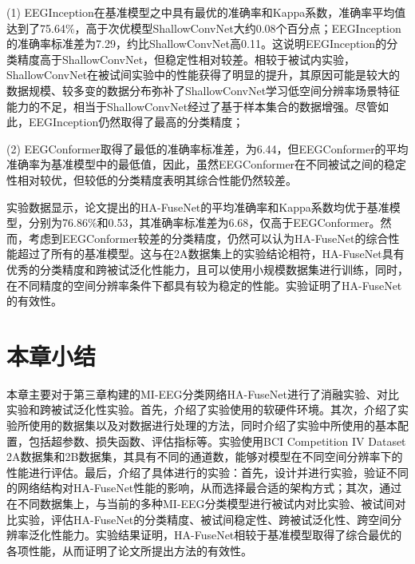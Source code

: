 (1) EEGInception在基准模型之中具有最优的准确率和Kappa系数，准确率平均值达到了75.64\%，高于次优模型ShallowConvNet大约0.08个百分点；EEGInception的准确率标准差为7.29，约比ShallowConvNet高0.11。这说明EEGInception的分类精度高于ShallowConvNet，但稳定性相对较差。相较于被试内实验，ShallowConvNet在被试间实验中的性能获得了明显的提升，其原因可能是较大的数据规模、较多变的数据分布弥补了ShallowConvNet学习低空间分辨率场景特征能力的不足，相当于ShallowConvNet经过了基于样本集合的数据增强。尽管如此，EEGInception仍然取得了最高的分类精度；

(2) EEGConformer取得了最低的准确率标准差，为6.44，但EEGConformer的平均准确率为基准模型中的最低值，因此，虽然EEGConformer在不同被试之间的稳定性相对较优，但较低的分类精度表明其综合性能仍然较差。

实验数据显示，论文提出的HA-FuseNet的平均准确率和Kappa系数均优于基准模型，分别为76.86\%和0.53，其准确率标准差为6.68，仅高于EEGConformer。然而，考虑到EEGConformer较差的分类精度，仍然可以认为HA-FuseNet的综合性能超过了所有的基准模型。这与在2A数据集上的实验结论相符，HA-FuseNet具有优秀的分类精度和跨被试泛化性能力，且可以使用小规模数据集进行训练，同时，在不同精度的空间分辨率条件下都具有较为稳定的性能。实验证明了HA-FuseNet的有效性。

\section{本章小结}

本章主要对于第三章构建的MI-EEG分类网络HA-FuseNet进行了消融实验、对比实验和跨被试泛化性实验。首先，介绍了实验使用的软硬件环境。其次，介绍了实验所使用的数据集以及对数据进行处理的方法，同时介绍了实验中所使用的基本配置，包括超参数、损失函数、评估指标等。实验使用BCI Competition IV Dataset 2A数据集和2B数据集，其具有不同的通道数，能够对模型在不同空间分辨率下的性能进行评估。最后，介绍了具体进行的实验：首先，设计并进行实验，验证不同的网络结构对HA-FuseNet性能的影响，从而选择最合适的架构方式；其次，通过在不同数据集上，与当前的多种MI-EEG分类模型进行被试内对比实验、被试间对比实验，评估HA-FuseNet的分类精度、被试间稳定性、跨被试泛化性、跨空间分辨率泛化性能力。实验结果证明，HA-FuseNet相较于基准模型取得了综合最优的各项性能，从而证明了论文所提出方法的有效性。